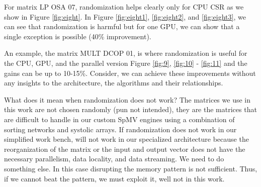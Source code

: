 \documentclass[manuscript,screen]{acmart}
\begin{document}
\newpage

For matrix LP OSA 07, randomization helps clearly only for CPU CSR as
we show in Figure \ref{fig:eight}. In Figure \ref{fig:eight1},
\ref{fig:eight2}, and \ref{fig:eight3}, we can see that randomization
is harmful but for one GPU, we can show that a single exception is
possible (40\% improvement).



\newpage
An example, the matrix MULT DCOP 01, is where randomization is useful
for the CPU, GPU, and the parallel version Figure \ref{fig:9},
\ref{fig:10} - \ref{fig:11} and the gains can be up to
10-15\%. Consider, we can achieve these improvements without any
insights to the architecture, the algorithms and their relationships.



What does it mean when randomization does not work? The matrices we
use in this work are not chosen randomly (pun not intended), they are
the matrices that are difficult to handle in our custom SpMV engines
using a combination of sorting networks and systolic arrays. If
randomization does not work in our simplified work bench, will not
work in our specialized architecture because the reorganization of the
matrix or the input and output vector does not have the necessary
parallelism, data locality, and data streaming. We need to do
something else. In this case disrupting the memory pattern is not
sufficient. Thus, if we cannot beat the pattern, we must exploit it,
well not in this work.
\end{document}
